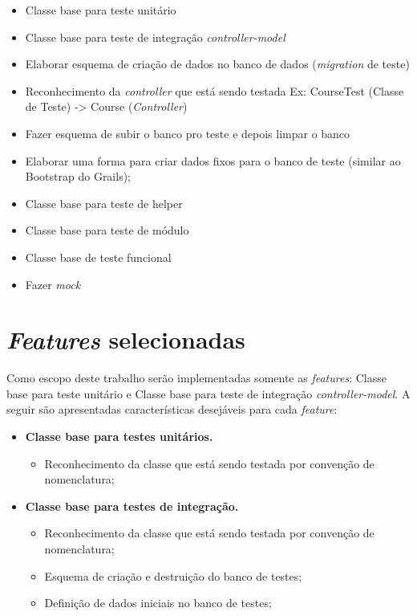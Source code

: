 \begin{itemize}

	\item Classe base para teste unitário
	\item Classe base para teste de integração \textit{controller-model}
	\item Elaborar esquema de criação de dados no banco de dados (\textit{migration} de teste)
	\item Reconhecimento da \textit{controller} que está sendo testada
		\subitem Ex: CourseTest (Classe de Teste) -> Course (\textit{Controller})
	\item Fazer esquema de subir o banco pro teste e depois limpar o banco
	\item Elaborar uma forma para criar dados fixos para o banco de teste (similar ao Bootstrap do Grails);
	\item Classe base para teste de helper
	\item Classe base para teste de módulo
	\item Classe base de teste funcional
	\item Fazer \textit{mock}

\end{itemize}

\section{\textit{Features} selecionadas}

Como escopo deste trabalho serão implementadas somente as \textit{features}: Classe base para teste unitário
e Classe base para teste de integração \textit{controller-model}. A seguir são apresentadas características desejáveis
para cada \textit{feature}:

\begin{itemize}
  \item \textbf{Classe base para testes unitários.}
    \begin{itemize}
      \item Reconhecimento da classe que está sendo testada por convenção de nomenclatura;
    \end{itemize}

  \item \textbf{Classe base para testes de integração.}
    \begin{itemize}
      \item Reconhecimento da classe que está sendo testada por convenção de nomenclatura;
      \item Esquema de criação e destruição do banco de testes;
      \item Definição de dados iniciais no banco de testes;
    \end{itemize}
\end{itemize}